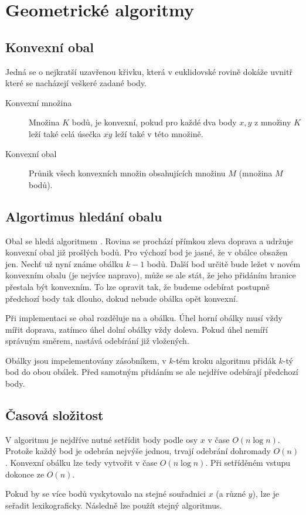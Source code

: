 \section{Geometrické algoritmy}

\subsection{Konvexní obal}

Jedná se o nejkratší uzavřenou křivku, která v euklidovské rovině dokáže uvnitř které se nacházejí veškeré zadané body.

\begin{description}
    \item[Konvexní množina] Množina $K$ bodů, je konvexní, pokud pro každé dva body $x, y$ z množiny $K$ leží také celá úsečka $\overline{xy}$ leží také v této množině.
    \item[Konvexní obal] Průnik všech konvexních množin obsahujících množinu $M$ (množina $M$ bodů).
\end{description}

\subsection{Algortimus hledání obalu}

Obal se hledá algoritmem .
Rovina se prochází přímkou zleva doprava a udržuje konvexní obal již prošlých bodů.
Pro výchozí bod je jasné, že v obálce obsažen jen.
Nechť už nyní známe obálku $k-1$ bodů.
Další bod určitě bude ležet v novém konvexním obalu (je nejvíce napravo), může se ale stát, že jeho přidáním hranice přestala být konvexním.
To lze opravit tak, že budeme odebírat postupně předchozí body tak dlouho, dokud nebude obálka opět konvexní.

Při implementaci se obal rozděluje na  a  obálku.
Úhel horní obálky musí vždy mířit doprava, zatímco úhel dolní obálky vždy doleva.
Pokud úhel nemíří správným směrem, nastává odebírání již vložených.

Obálky jsou impelementovány zásobníkem, v $k$-tém kroku algoritmu přidák $k$-tý bod do obou obálek.
Před samotným přidáním se ale nejdříve odebírají předchozí body.

\subsection{Časová složitost}

V algoritmu je nejdříve nutné setřídit body podle osy $x$ v čase $O(n \log{n})$.
Protože každý bod je odebrán nejvýše jednou, trvají odebrání dohromady $O(n)$.
Konvexní obálku lze tedy vytvořit v čase $O(n \log{n})$.
Při setříděném vstupu dokonce ze $O(n)$.

Pokud by se více bodů vyskytovalo na stejné souřadnici $x$ (a různé $y$), lze je seřadit lexikograficky.
Následně lze použít stejný algoritmus.
